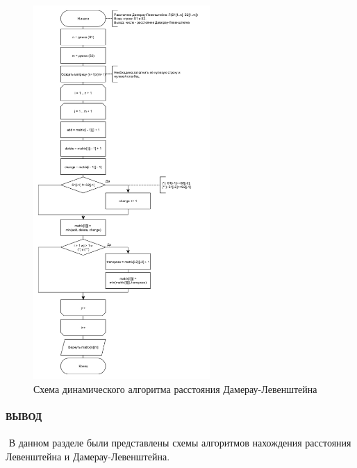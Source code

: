 \begin{figure}[h]
    \centering
    \includegraphics[width=0.6\textwidth]{images/d_lev_dyn.jpg}
    \caption{Схема динамического алгоритма расстояния Дамерау-Левенштейна}
    \label{fig:images-ddyn-lev}
\end{figure}

\paragraph*{ВЫВОД} ${}$ \newline
В данном разделе были представлены схемы алгоритмов нахождения расстояния Левенштейна и
Дамерау-Левенштейна.


\clearpage

